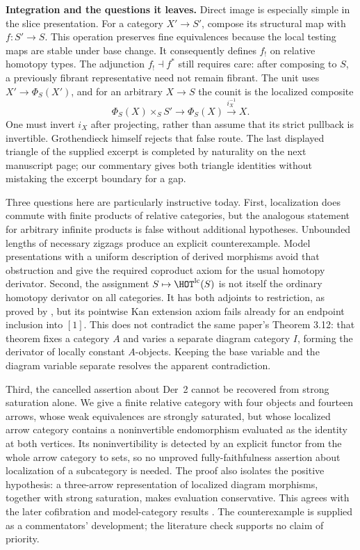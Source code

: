 \medskip
\noindent\textbf{Integration and the questions it leaves.}
Direct image is especially simple in the slice presentation. For a category
$X'\to S'$, compose its structural map with $f:S'\to S$. This operation
preserves fine equivalences because the local testing maps are stable under
base change. It consequently defines $f_!$ on relative homotopy types. The
adjunction $f_!\dashv f^*$ still requires care: after composing to $S$, a
previously fibrant representative need not remain fibrant. The unit uses
$X'\to\Phi_S(X')$, and for an arbitrary $X\to S$ the counit is the localized
composite
\[
 \Phi_S(X)\times_S S'\longrightarrow\Phi_S(X)
 \xrightarrow{i_X^{-1}}X.
\]
One must invert $i_X$ after projecting, rather than assume that its strict
pullback is invertible. Grothendieck himself rejects that false route. The
last displayed triangle of the supplied excerpt is completed by naturality
on the next manuscript page; our commentary gives both triangle identities
without mistaking the excerpt boundary for a gap.

Three questions here are particularly instructive today. First, localization
does commute with finite products of relative categories, but the analogous
statement for arbitrary infinite products is false without additional
hypotheses. Unbounded lengths of necessary zigzags produce an explicit
counterexample. Model presentations with a uniform description of derived
morphisms avoid that obstruction and give the required coproduct axiom for
the usual homotopy derivator. Second, the assignment
$S\mapsto\HOT^{\mathrm{lc}}(S)$ is not itself the ordinary homotopy derivator
on all categories. It has both adjoints to restriction, as proved by
\citet[Corollary 3.10]{Cisinski2009LocallyConstant}, but its pointwise Kan
extension axiom fails already for an endpoint inclusion into $[1]$. This
does not contradict the same paper's Theorem 3.12: that theorem fixes a
category $A$ and varies a separate diagram category $I$, forming the
derivator of locally constant $A$-objects. Keeping the base variable and the
diagram variable separate resolves the apparent contradiction.

Third, the cancelled assertion about Der~2 cannot be recovered from strong
saturation alone. We give a finite relative category with four objects and
fourteen arrows, whose weak equivalences are strongly saturated, but whose
localized arrow category contains a noninvertible endomorphism evaluated
as the identity at both vertices. Its noninvertibility is detected by an
explicit functor from the whole arrow category to sets, so no unproved
fully-faithfulness assertion about localization of a subcategory is needed.
The proof also isolates the positive hypothesis: a three-arrow
representation of localized diagram morphisms, together with strong
saturation, makes evaluation conservative. This agrees with the later
cofibration and model-category results
\citep[Theorem 3.33]{Lenz2018}. The counterexample is supplied as a
commentators' development; the literature check supports no claim of
priority.

